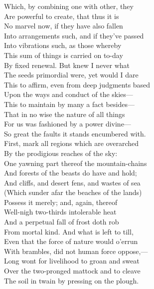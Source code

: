 Which, by combining one with other, they\\
Are powerful to create, that thus it is\\
No marvel now, if they have also fallen\\
Into arrangements such, and if they've passed\\
Into vibrations such, as those whereby\\
This sum of things is carried on to-day\\
By fixed renewal. But knew I never what\\
The seeds primordial were, yet would I dare\\
This to affirm, even from deep judgments based\\
Upon the ways and conduct of the skies—\\
This to maintain by many a fact besides—\\
That in no wise the nature of all things\\
For us was fashioned by a power divine—\\
So great the faults it stands encumbered with.\\
First, mark all regions which are overarched\\
By the prodigious reaches of the sky:\\
One yawning part thereof the mountain-chains\\
And forests of the beasts do have and hold;\\
And cliffs, and desert fens, and wastes of sea\\
(Which sunder afar the beaches of the lands)\\
Possess it merely; and, again, thereof\\
Well-nigh two-thirds intolerable heat\\
And a perpetual fall of frost doth rob\\
From mortal kind. And what is left to till,\\
Even that the force of nature would o'errun\\
With brambles, did not human force oppose,—\\
Long wont for livelihood to groan and sweat\\
Over the two-pronged mattock and to cleave\\
The soil in twain by pressing on the plough.

